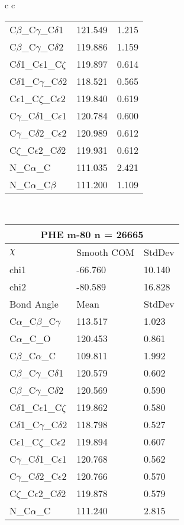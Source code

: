\begin{longtable}{ c c }
\begin{tabular}{ l l l }
  C$\beta$\_C$\gamma$\_C$\delta$1 & 121.549 & 1.215\\
  C$\beta$\_C$\gamma$\_C$\delta$2 & 119.886 & 1.159\\
  C$\delta$1\_C$\epsilon$1\_C$\zeta$ & 119.897 & 0.614\\
  C$\delta$1\_C$\gamma$\_C$\delta$2 & 118.521 & 0.565\\
  C$\epsilon$1\_C$\zeta$\_C$\epsilon$2 & 119.840 & 0.619\\
  C$\gamma$\_C$\delta$1\_C$\epsilon$1 & 120.784 & 0.600\\
  C$\gamma$\_C$\delta$2\_C$\epsilon$2 & 120.989 & 0.612\\
  C$\zeta$\_C$\epsilon$2\_C$\delta$2 & 119.931 & 0.612\\
  N\_C$\alpha$\_C & 111.035 & 2.421\\
  N\_C$\alpha$\_C$\beta$ & 111.200 & 1.109\\
  \bottomrule
  \end{tabular}
  \\
  \begin{tabular}{ l l l }
  \toprule
  \multicolumn{3}{c}{PHE \textbf{m-80} n = 26665} \\ \toprule
  $\chi$       & Smooth COM & StdDev \\ \midrule
  chi1 & -66.760 & 10.140 \\ 
  chi2 & -80.589 & 16.828 \\ \midrule
  Bond Angle   & Mean     & StdDev \\ \midrule
  C$\alpha$\_C$\beta$\_C$\gamma$ & 113.517 & 1.023\\
  C$\alpha$\_C\_O & 120.453 & 0.861\\
  C$\beta$\_C$\alpha$\_C & 109.811 & 1.992\\
  C$\beta$\_C$\gamma$\_C$\delta$1 & 120.579 & 0.602\\
  C$\beta$\_C$\gamma$\_C$\delta$2 & 120.569 & 0.590\\
  C$\delta$1\_C$\epsilon$1\_C$\zeta$ & 119.862 & 0.580\\
  C$\delta$1\_C$\gamma$\_C$\delta$2 & 118.798 & 0.527\\
  C$\epsilon$1\_C$\zeta$\_C$\epsilon$2 & 119.894 & 0.607\\
  C$\gamma$\_C$\delta$1\_C$\epsilon$1 & 120.768 & 0.562\\
  C$\gamma$\_C$\delta$2\_C$\epsilon$2 & 120.766 & 0.570\\
  C$\zeta$\_C$\epsilon$2\_C$\delta$2 & 119.878 & 0.579\\
  N\_C$\alpha$\_C & 111.240 & 2.815\\

\end{tabular}
\end{longtable}
